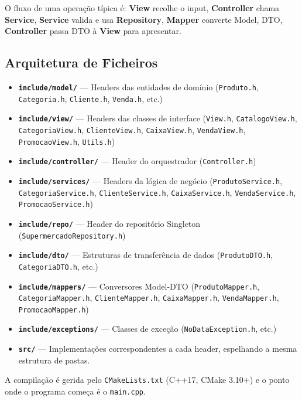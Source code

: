 \documentclass[a4paper]{llncs}
\begin{document}
O fluxo de uma operação típica é: \textbf{View} recolhe o input, \textbf{Controller} chama \textbf{Service}, \textbf{Service} valida e usa \textbf{Repository}, \textbf{Mapper} converte Model, DTO, \textbf{Controller} passa DTO à \textbf{View} para apresentar.

\subsection{Arquitetura de Ficheiros}

\begin{itemize}
    \item \textbf{\texttt{include/model/}} — Headers das entidades de domínio (\texttt{Produto.h}, \texttt{Categoria.h}, \texttt{Cliente.h}, \texttt{Venda.h}, etc.)
    \item \textbf{\texttt{include/view/}} — Headers das classes de interface (\texttt{View.h}, \texttt{CatalogoView.h}, \texttt{CategoriaView.h}, \texttt{ClienteView.h}, \texttt{CaixaView.h}, \texttt{VendaView.h}, \texttt{PromocaoView.h}, \texttt{Utils.h})
    \item \textbf{\texttt{include/controller/}} — Header do orquestrador (\texttt{Controller.h})
    \item \textbf{\texttt{include/services/}} — Headers da lógica de negócio (\texttt{ProdutoService.h}, \texttt{CategoriaService.h}, \texttt{ClienteService.h}, \texttt{CaixaService.h}, \texttt{VendaService.h}, \texttt{PromocaoService.h})
    \item \textbf{\texttt{include/repo/}} — Header do repositório Singleton (\texttt{SupermercadoRepository.h})
    \item \textbf{\texttt{include/dto/}} — Estruturas de transferência de dados (\texttt{ProdutoDTO.h}, \texttt{CategoriaDTO.h}, etc.)
    \item \textbf{\texttt{include/mappers/}} — Conversores Model-DTO (\texttt{ProdutoMapper.h}, \texttt{CategoriaMapper.h}, \texttt{ClienteMapper.h}, \texttt{CaixaMapper.h}, \texttt{VendaMapper.h}, \texttt{PromocaoMapper.h})
    \item \textbf{\texttt{include/exceptions/}} — Classes de exceção (\texttt{NoDataException.h}, etc.)
    \item \textbf{\texttt{src/}} — Implementações correspondentes a cada header, espelhando a mesma estrutura de pastas.
\end{itemize}

A compilação é gerida pelo \texttt{CMakeLists.txt} (C++17, CMake 3.10+) e o ponto onde o programa começa é o \texttt{main.cpp}.
\end{document}
